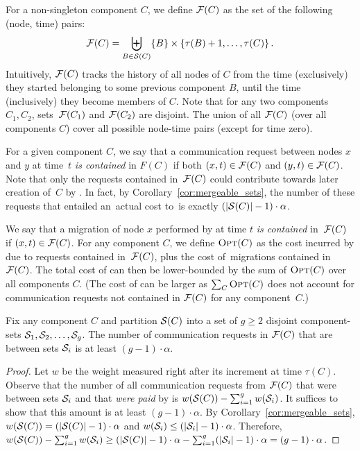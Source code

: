 For a non-singleton component $C$, we 
define $\mathcal{F}(C)$ as the set of the following (node, time) pairs:
\begin{align*}
	\mathcal{F}(C) = \biguplus_{B \in \mathcal{S}(C)} \{ B \}  \times \left\{ \tau(B)+1, \ldots, \tau(C) \right\}.
\end{align*}
Intuitively, $\mathcal{F}(C)$ tracks the history of all nodes of $C$ from the time 
(exclusively) they started belonging to some previous component $B$, until the time 
(inclusively) they become members of $C$. Note that for any two components 
$C_1,C_2$, sets~$\mathcal{F}(C_1)$ and $\mathcal{F}(C_2)$ are disjoint.
The union of all $\mathcal{F}(C)$ (over all components $C$) 
cover all possible node-time pairs (except for time zero). 

For a given component $C$, we say that a communication request between nodes
$x$ and $y$ at time~$t$ \emph{is contained} in $F(C)$ if both $(x,t) \in \mathcal{F}(C)$
and $(y,t) \in \mathcal{F}(C)$. Note that only the requests contained in~$\mathcal{F}(C)$
could contribute towards later creation of~$C$ by \CREP. In fact, by
Corollary~\ref{cor:mergeable_sets}, the number of these requests that
entailed an~actual cost to~\CREP is exactly $(|\mathcal{S}(C)| - 1) \cdot \alpha$.

We say that a migration of node $x$ performed by \OPT at time $t$ \emph{is
contained} in~$\mathcal{F}(C)$ if $(x,t) \in \mathcal{F}(C)$. For any component $C$, we define
$\textsc{Opt}(C)$ as the cost incurred by \OPT due to requests contained in~$\mathcal{F}(C)$, 
plus the cost of~\OPT migrations contained in~$\mathcal{F}(C)$. The total cost of \OPT
can then be lower-bounded by the sum of $\textsc{Opt}(C)$ over all components $C$.
(The cost of \OPT can be larger as $\sum_C \textsc{Opt}(C)$ does not account for 
communication requests not contained in $\mathcal{F}(C)$ for any component~$C$.)

\begin{lemma}
\label{lem:merge_action_cut}
Fix any component $C$ and partition $\mathcal{S}(C)$ into a set of $g \geq 2$ disjoint
component-sets $\mathcal{S}_1, \mathcal{S}_2, \ldots, \mathcal{S}_g$. The number of communication requests
in $\mathcal{F}(C)$ that are between sets $\mathcal{S}_i$ is at least $(g-1) \cdot \alpha$.
\end{lemma}

\begin{proof}
Let $w$ be the weight measured right after its increment at time $\tau(C)$.
Observe that the number of all communication requests from $\mathcal{F}(C)$ that were
between sets $\mathcal{S}_i$ and that \emph{were paid} by \CREP is $w(\mathcal{S}(C)) -
\sum_{i=1}^g w(\mathcal{S}_i)$. It suffices to show that this amount is at least $(g-1)
\cdot \alpha$. By Corollary~\ref{cor:mergeable_sets}, $w(\mathcal{S}(C)) = (|\mathcal{S}(C)|-1)
\cdot \alpha$ and $w(\mathcal{S}_i) \leq (|\mathcal{S}_i|-1) \cdot \alpha$. Therefore, $w(\mathcal{S}(C)) -
\sum_{i=1}^g w(\mathcal{S}_i) \geq (|\mathcal{S}(C)|-1) \cdot \alpha - \sum_{i=1}^g (|\mathcal{S}_i|-1)
\cdot \alpha = (g-1) \cdot \alpha$.
\end{proof}

